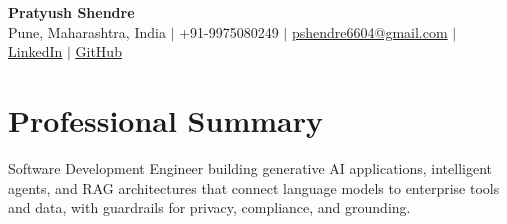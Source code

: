 \documentclass[a4paper,11pt]{article}
\begin{document}
\begin{center}
  {\Large\bfseries Pratyush Shendre}\\[2pt]
  \small Pune, Maharashtra, India $|$ +91-9975080249 $|$
  \href{mailto:pshendre6604@gmail.com}{pshendre6604@gmail.com} $|$
  \href{https://www.linkedin.com/in/pratyush-shendre-2256a7223/}{\underline{LinkedIn}} $|$
  \href{https://github.com/PratyushS04}{\underline{GitHub}}
\end{center}

\section{Professional Summary}
\small Software Development Engineer building generative AI applications, intelligent agents, and RAG architectures that connect language models to enterprise tools and data, with guardrails for privacy, compliance, and grounding.
\end{document}
